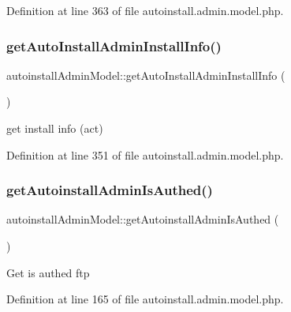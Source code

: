 Definition at line 363 of file autoinstall.\+admin.\+model.\+php.

\hypertarget{classautoinstallAdminModel_ad6d50fbb755d2b48cdbd4269a1d1e404}{}\label{classautoinstallAdminModel_ad6d50fbb755d2b48cdbd4269a1d1e404} 
\subsubsection{\texorpdfstring{get\+Auto\+Install\+Admin\+Install\+Info()}{getAutoInstallAdminInstallInfo()}}
{\footnotesize\ttfamily autoinstall\+Admin\+Model\+::get\+Auto\+Install\+Admin\+Install\+Info (\begin{DoxyParamCaption}{ }\end{DoxyParamCaption})}

get install info (act) 

Definition at line 351 of file autoinstall.\+admin.\+model.\+php.

\hypertarget{classautoinstallAdminModel_ac0b475b5969fded7a56103ba2e1fa710}{}\label{classautoinstallAdminModel_ac0b475b5969fded7a56103ba2e1fa710} 
\subsubsection{\texorpdfstring{get\+Autoinstall\+Admin\+Is\+Authed()}{getAutoinstallAdminIsAuthed()}}
{\footnotesize\ttfamily autoinstall\+Admin\+Model\+::get\+Autoinstall\+Admin\+Is\+Authed (\begin{DoxyParamCaption}{ }\end{DoxyParamCaption})}

Get is authed ftp 

Definition at line 165 of file autoinstall.\+admin.\+model.\+php.

\hypertarget{classautoinstallAdminModel_a3892c760f1b77e23fdb38a9784cf0ec2}{}\label{classautoinstallAdminModel_a3892c760f1b77e23fdb38a9784cf0ec2} 
